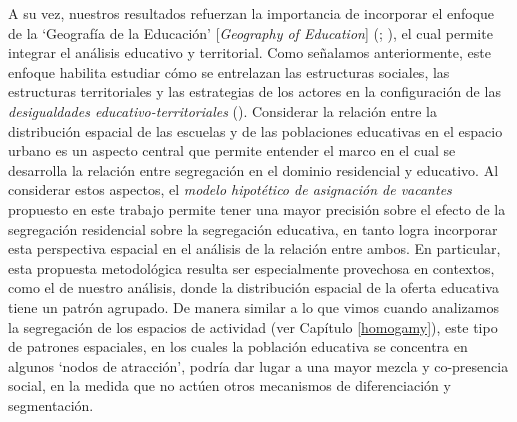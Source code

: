 \documentclass[
  spanish,
  a4paper,%
  chapterprefix=true,%
  DIV=calc,%
  twoside]{scrbook}%
\begin{document}
A su vez, nuestros resultados refuerzan la importancia de incorporar el
enfoque de la `Geografía de la Educación' {[}\emph{Geography of Education}{]}
(; ), el cual permite integrar el análisis
educativo y territorial. Como señalamos anteriormente, este enfoque
habilita estudiar cómo se entrelazan las estructuras sociales, las
estructuras territoriales y las estrategias de los actores en la
configuración de las \emph{desigualdades educativo-territoriales}
(). Considerar la relación entre la distribución espacial de
las escuelas y de las poblaciones educativas en el espacio urbano es un
aspecto central que permite entender el marco en el cual se desarrolla
la relación entre segregación en el dominio residencial y educativo. Al
considerar estos aspectos, el \emph{modelo hipotético de asignación de
vacantes} propuesto en este trabajo permite tener una mayor precisión
sobre el efecto de la segregación residencial sobre la segregación
educativa, en tanto logra incorporar esta perspectiva espacial en el
análisis de la relación entre ambos. En particular, esta propuesta
metodológica resulta ser especialmente provechosa en contextos, como el
de nuestro análisis, donde la distribución espacial de la oferta
educativa tiene un patrón agrupado. De manera similar a lo que vimos
cuando analizamos la segregación de los espacios de actividad (ver
Capítulo \ref{homogamy}), este tipo de patrones espaciales, en los
cuales la población educativa se concentra en algunos `nodos de
atracción', podría dar lugar a una mayor mezcla y co-presencia social,
en la medida que no actúen otros mecanismos de diferenciación y
segmentación.
\end{document}

